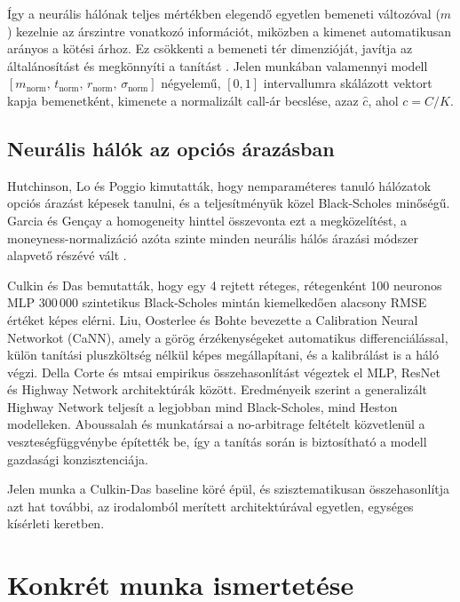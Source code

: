Így a neurális hálónak teljes mértékben elegendő egyetlen bemeneti változóval ($m$) kezelnie az
árszintre vonatkozó információt, miközben a kimenet automatikusan arányos a kötési árhoz.
Ez csökkenti a bemeneti tér dimenzióját, javítja az általánosítást és megkönnyíti a tanítást \cite{garcia2000}.
Jelen munkában valamennyi modell
$[m_\text{norm},\,t_\text{norm},\,r_\text{norm},\,\sigma_\text{norm}]$
négyelemű, $[0,1]$ intervallumra skálázott vektort kapja bemenetként, kimenete a normalizált call-ár becslése, azaz $\hat c$, ahol $c=C/K$.

\subsection{Neurális hálók az opciós árazásban}

Hutchinson, Lo és Poggio \cite{hutchinson1994} kimutatták, hogy
nemparaméteres tanuló hálózatok opciós árazást képesek tanulni, és a
teljesítményük közel Black-Scholes minőségű.
Garcia és Gençay \cite{garcia2000} a homogeneity hinttel összevonta ezt a
megközelítést, a moneyness-normalizáció azóta szinte minden neurális hálós
árazási módszer alapvető részévé vált \cite{ruf2020}.

Culkin és Das \cite{culkin2017} bemutatták, hogy egy 4 rejtett réteges,
rétegenként 100 neuronos MLP 300\,000 szintetikus Black-Scholes mintán
kiemelkedően alacsony RMSE értéket képes elérni.
Liu, Oosterlee és Bohte \cite{liu2019} bevezette a Calibration Neural Networkot
(CaNN), amely a görög érzékenységeket automatikus differenciálással, külön tanítási pluszköltség nélkül képes megállapítani, és a kalibrálást is a háló végzi.
Della Corte és mtsai \cite{dellacorte2023} empirikus összehasonlítást végeztek el MLP,
ResNet és Highway Network architektúrák között. Eredményeik szerint a generalizált
Highway Network teljesít a legjobban mind Black-Scholes, mind Heston
modelleken.
Aboussalah és munkatársai \cite{liao2024} a no-arbitrage feltételt közvetlenül a veszteségfüggvénybe építették be, így a tanítás során is biztosítható a modell gazdasági konzisztenciája.

Jelen munka a Culkin-Das baseline köré épül, és szisztematikusan összehasonlítja
azt hat további, az irodalomból merített architektúrával egyetlen, egységes
kísérleti keretben.


\section{Konkrét munka ismertetése}

